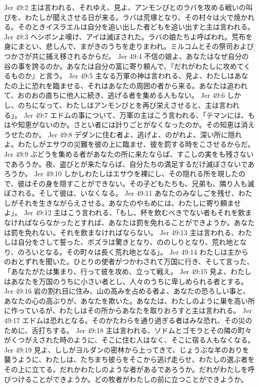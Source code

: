Jer 49:2  主は言われる、それゆえ、見よ、アンモンびとのラバを攻める戦いの叫びを、わたしが聞えさせる日が来る。ラバは荒塚となり、その村々は火で焼かれる。そのときイスラエルは自分を追い出した者どもを追い出すと主は言われる。
Jer 49:3  ヘシボンよ嘆け、アイは滅ぼされた。ラバの娘たちよ呼ばわれ。荒布を身にまとい、悲しんで、まがきのうちを走りまわれ。ミルコムとその祭司およびつかさが共に捕え移されるからだ。
Jer 49:4  不信の娘よ、あなたはなぜ自分の谷の事を誇るのか。あなたは自分の富に寄り頼んで、『だれがわたしに攻めてくるものか』と言う。
Jer 49:5  主なる万軍の神は言われる、見よ、わたしはあなたの上に恐れを臨ませる、それはあなたの周囲の者から来る。あなたは追われて、おのおの直ちに他人に続き、逃げる者を集める人もない。
Jer 49:6  しかし、のちになって、わたしはアンモンびとを再び栄えさせると、主は言われる」。
Jer 49:7  エドムの事について、万軍の主はこう言われる、「テマンには、もはや知恵がないのか。さとい者には計りごとがなくなったのか。その知恵は消えうせたのか。
Jer 49:8  デダンに住む者よ、逃げよ、のがれよ、深い所に隠れよ。わたしがエサウの災難を彼の上に臨ませ、彼を罰する時をこさせるからだ。
Jer 49:9  ぶどうを集める者があなたの所に来たならば、すこしの実をも残さないであろうか。夜、盗びとが来たならば、自分たちの満足するだけ滅ぼさないであろうか。
Jer 49:10  しかしわたしはエサウを裸にし、その隠れる所を現したので、彼はその身を隠すことができない。その子どもたちも、兄弟も、隣り人も滅ぼされる。そして彼は、いなくなる。
Jer 49:11  あなたのみなしごを残せ、わたしがそれを生きながらえさせる。あなたのやもめには、わたしに寄り頼ませよ」。
Jer 49:12  主はこう言われる、「もし、杯を飲むべきでない者もそれを飲まなければならなかったとすれば、あなたは罰を免れることができようか。あなたは罰を免れない。それを飲まなければならない。
Jer 49:13  主は言われる、わたしは自分をさして誓った、ボズラは驚きとなり、ののしりとなり、荒れ地となり、のろいとなる。その町々は長く荒れ地となる」。
Jer 49:14  わたしは主からのおとずれを聞いた。ひとりの使者がつかわされて万国に行き、そして言った、「あなたがたは集まり、行って彼を攻め、立って戦え。
Jer 49:15  見よ、わたしはあなたを万国のうちに小さい者とし、人々のうちに卑しめられる者とする。
Jer 49:16  岩の割れ目に住み、山の高みを占める者よ、あなたの恐ろしい事と、あなたの心の高ぶりが、あなたを欺いた。あなたは、わたしのように巣を高い所に作っているが、わたしはその所からあなたを取りおろすと主は言われる。
Jer 49:17  エドムは恐れとなる。そのかたわらを通り過ぎる者はみな恐れ、その災のために、舌打ちする。
Jer 49:18  主は言われる、ソドムとゴモラとその隣の町々がくつがえされた時のように、そこに住む人はなく、そこに宿る人もなくなる。
Jer 49:19  見よ、ししがヨルダンの密林から上ってきて、じょうぶな羊のおりを襲うように、わたしは、たちまち彼らをそこから逃げ走らせ、わたしの選ぶ者をその上に立てる。だれかわたしのような者があるであろうか。だれがわたしを呼びつけることができようか。どの牧者がわたしの前に立つことができようか。
